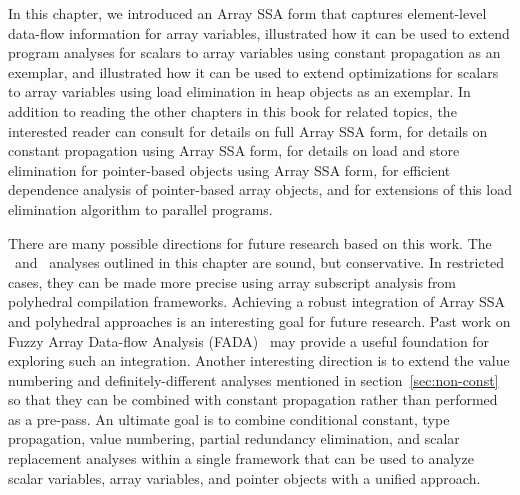 
In this chapter,
we introduced an Array SSA form 
that captures element-level data-flow information for array variables,
illustrated how it can be used to extend program analyses for
scalars to array variables using constant propagation 
as an exemplar, and illustrated how it can be used to extend
optimizations for scalars to array variables using load elimination in
heap objects as
an exemplar.
In addition to reading the other chapters in this book for related
topics, the interested reader can consult \cite{KnSa98} for 
details on full Array SSA form, \cite{KnSa98b} for details on constant
propagation using Array SSA form, \cite{FiKS00} for
details on load and store elimination for pointer-based objects using
Array SSA form, \cite{SaFi01} for efficient dependence analysis of
pointer-based array objects, and \cite{BaSa09} for extensions of this load
elimination algorithm to parallel programs.


There are many possible directions for future research based on this
work.
The \ds\ and \dd\ analyses outlined in this chapter are sound, but
conservative.  In restricted cases, they can be made more precise using array subscript
analysis from polyhedral compilation frameworks.  Achieving a robust
integration of Array SSA and polyhedral approaches is an interesting goal for future
research.  Past work on Fuzzy Array Data-flow Analysis
(FADA)~\cite{BCF97} may provide a useful foundation for exploring such
an integration.
Another interesting direction is to extend the value numbering and 
definitely-different analyses mentioned in section~\ref{sec:non-const}
so that they can be combined with constant propagation
rather than performed as a pre-pass.
An ultimate goal is
to combine conditional constant, type propagation, value numbering, partial redundancy elimination,
and scalar replacement analyses within a single framework that can be
used to analyze scalar variables, array variables, and pointer objects
with a unified approach.
